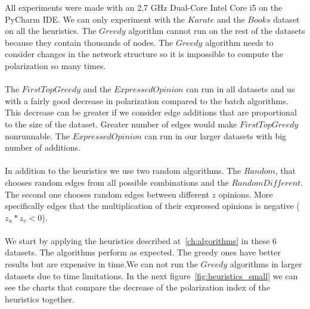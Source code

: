 All experiments were made with an 2,7 GHz Dual-Core Intel Core i5 on the PyCharm IDE. We can only experiment with the $Karate$ and the $Books$ dataset on all the heuristics. The $Greedy$ algorithm cannot run on the rest of the datasets because they contain thousands of nodes. The $Greedy$ algorithm needs to consider changes in the network structure so it is impossible to compute the polarization so many times.
\\
\\ 
The $FirstTopGreedy$ and the $Expressed Opinion$ can run in all datasets and us with a fairly good decrease in polarization compared to the batch algorithms. This decrease can be greater if we consider edge additions that are proportional to the size of the dataset. Greater number of edges would make $FirstTopGreedy$ nonrunnable. The $Expressed Opinion$ can run in our larger datasets with big number of additions.
\\
\\
In addition to the heuristics we use two random algorithms. The $Random$, that chooses random edges from all possible combinations and the $RandomDifferent$. The second one chooses random edges between different $z$ opinions. More specifically edges that the multiplication of their expressed opinions is negative ($z_u*z_v < 0$). 
\\
\\
\noindent We start by applying the heuristics described at~\ref{ch:algorithms} in these 6 datasets. The algorithms perform as expected. The greedy ones have better results but are expensive in time.We can not run the $Greedy$ algorithms in larger datasets due to time limitations. In the next figure~\ref{fig:heuristics_small} we can see the charts that compare the decrease of the polarization index of the heuristics together.
\clearpage

